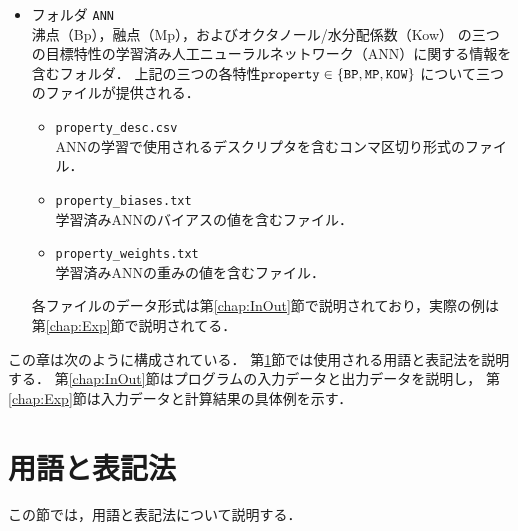 \documentclass[11pt,titlepage,dvipdfmx,twoside]{jsbook}
\newcommand{\target}{目標}
\begin{document}
{\begin{itemize}
\begin{itemize}
\item フォルダ {\tt ANN}\\
沸点（Bp），融点（Mp），およびオクタノール/水分配係数（Kow）
の三つの\target 特性の学習済み人工ニューラルネットワーク（ANN）に関する情報を含むフォルダ．
上記の三つの各特性${\tt property}\in \{{\tt BP, MP, KOW}\}$ について三つのファイルが提供される．
%
\begin{itemize}
\item {\tt property\_desc.csv}\\
ANNの学習で使用されるデスクリプタを含むコンマ区切り形式のファイル．

\item {\tt property\_biases.txt}\\
学習済みANNのバイアスの値を含むファイル．

\item {\tt property\_weights.txt}\\
学習済みANNの重みの値を含むファイル．
\end{itemize}
%
各ファイルのデータ形式は第\ref{chap:InOut}節で説明されており，実際の例は第\ref{chap:Exp}節で説明されてる．

% 
%
\end{itemize}
\end{itemize}
}

この章は次のように構成されている．
第\ref{chap:Pre}節では使用される用語と表記法を説明する．
%
第\ref{chap:InOut}節はプログラムの入力データと出力データを説明し，
第\ref{chap:Exp}節は入力データと計算結果の具体例を示す．


\section{用語と表記法}
\label{chap:Pre}
%
この節では，用語と表記法について説明する．
\end{document}

